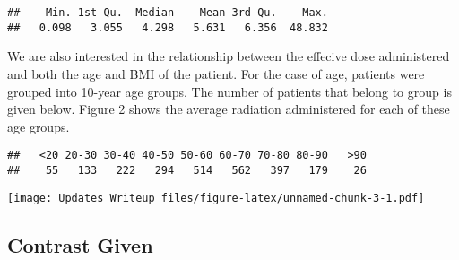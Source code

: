 \documentclass[]{article}
\begin{document}
\begin{verbatim}
##    Min. 1st Qu.  Median    Mean 3rd Qu.    Max. 
##   0.098   3.055   4.298   5.631   6.356  48.832
\end{verbatim}

We are also interested in the relationship between the effecive dose
administered and both the age and BMI of the patient. For the case of
age, patients were grouped into 10-year age groups. The number of
patients that belong to group is given below. Figure 2 shows the average
radiation administered for each of these age groups.

\begin{verbatim}
##   <20 20-30 30-40 40-50 50-60 60-70 70-80 80-90   >90 
##    55   133   222   294   514   562   397   179    26
\end{verbatim}

\texttt{[image: Updates\_Writeup\_files/figure-latex/unnamed-chunk-3-1.pdf]}

\subsection{Contrast Given}\label{contrast-given}
\end{document}
